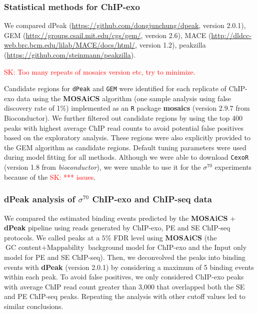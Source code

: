 \documentclass{bmcart}
\newcommand{\SK}[1]{\textcolor{red}{SK: #1}}
\newcommand{\sig}{\sigma^{70}}
\begin{document}
\subsubsection*{Statistical methods for ChIP-exo}

We compared dPeak \cite{dpeak} (\url{https://github.com/dongjunchung/dpeak}, version 2.0.1), GEM \cite{gem} (\url{http://groups.csail.mit.edu/cgs/gem/}, version 2.6), MACE \cite{mace} (\url{http://dldcc-web.brc.bcm.edu/lilab/MACE/docs/html/}, version 1.2), peakzilla \cite{peakzilla} (\url{https://github.com/steinmann/peakzilla}).

%

\SK{Too many repeats of mosaics version etc, try to minimize.}

Candidate regions for
\texttt{dPeak} and \texttt{GEM} were identified for each replicate of
ChIP-exo data using the \textbf{MOSAiCS} algorithm \cite{mosaics} (one
sample analysis using false discovery rate of 1\%) implemented as an \texttt{R}
package \textbf{mosaics} (version 2.9.7 from
Bioconductor). We further filtered out candidate regions by
using the top 400 peaks with highest average ChIP read counts to avoid
potential false positives based on the exploratory analysis. These
regions were also explicitly provided to the GEM algorithm as
candidate regions. Default tuning parameters were used during model
fitting for all methods. Although we were able to download \texttt{CexoR} \cite{cexor} (version 1.8  from \emph{bioconductor}), we were unable to use it for
the $\sig$ experiments because of the \SK{*** issues}.

\subsubsection*{dPeak analysis of $\sig$ ChIP-exo and ChIP-seq data}

We compared the estimated binding events predicted by the
\textbf{MOSAiCS} + \textbf{dPeak} pipeline using reads generated by
ChIP-exo, PE and SE ChIP-seq protocols. We called peaks at a $5\%$ FDR
level using \textbf{MOSAiCS} (the $\mbox{GC content} +
\mbox{Mappability}$ background model for ChIP-exo and the $\mbox{Input only}$
model for PE and SE ChIP-seq). Then, we deconvolved the peaks into
binding events with \textbf{dPeak} (version 2.0.1) by considering a
maximum of 5 binding events within each peak. To avoid false positives, we
only considered ChIP-exo peaks with average ChIP read count greater than
3,000 that overlapped both the SE and PE ChIP-seq peaks. Repeating the analysis with other cutoff values led to similar conclusions.
\end{document}
